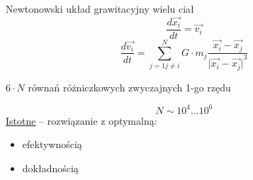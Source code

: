 \begin{frame}{Newtonowski układ grawitacyjny wielu ciał}
  $$\frac{d \vec{x_i}}{dt} = \vec{v_i}$$
  $$\frac{d \vec{v_i}}{dt} =\sum_{j = 1 j \not= i}^{N}G \cdot m_j \frac{\vec{x_i} - \vec{x_j}}{{\vert{\vec{x_i} - \vec{x_j}}\vert}^3}$$
  \begin{center}
  	$6 \cdot N$ równań różniczkowych zwyczajnych 1-go rzędu
  \end{center}
  $$N \sim 10^4 ... 10^6$$
  \underline{Istotne} -- rozwiązanie z optymalną:
  \begin{itemize}
    \item efektywnością
    \item dokładnością
  \end{itemize}
\end{frame}
